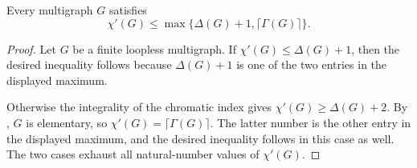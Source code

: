 \begin{theorem}
Every multigraph $G$ satisfies
\[
  \chi'(G)\le
  \max\{\Delta(G)+1,\lceil\Gamma(G)\rceil\}.
\]
\end{theorem}
\begin{proof}
Let $G$ be a finite loopless multigraph.  If
$\chi'(G)\le\Delta(G)+1$, then the desired inequality follows because
$\Delta(G)+1$ is one of the two entries in the displayed maximum.

Otherwise the integrality of the chromatic index gives
$\chi'(G)\ge\Delta(G)+2$.  By
, $G$ is elementary, so
$\chi'(G)=\lceil\Gamma(G)\rceil$.  The latter number is the other entry in
the displayed maximum, and the desired inequality follows in this case as
well.  The two cases exhaust all natural-number values of $\chi'(G)$.
\end{proof}
